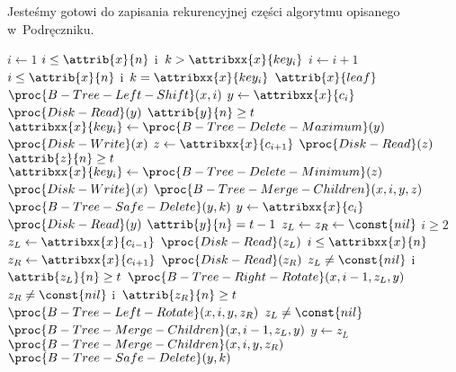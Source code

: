 Jesteśmy gotowi do zapisania rekurencyjnej części algorytmu opisanego w~Podręczniku.
\begin{codebox}
    \li $i\gets1$ \label{li:b-tree-safe-delete-search-begin}
    \li \While $i\le\attrib{x}{n}$ i~$k>\attribxx{x}{key_i}$
    \li     \Do $i\gets i+1$
            \End \label{li:b-tree-safe-delete-search-end}
    \li \If $i\le\attrib{x}{n}$ i~$k=\attribxx{x}{key_i}$
    \li     \Then \If $\attrib{x}{leaf}$
    \li         \Then $\proc{B-Tree-Left-Shift}(x,i)$ \label{li:b-tree-safe-delete-remove-from-leaf}
    \li         \Else $y\gets\attribxx{x}{c_i}$ \label{li:b-tree-safe-delete-remove-predecessor-begin}
    \li             $\proc{Disk-Read}(y)$
    \li             \If $\attrib{y}{n}\ge t$
    \li                 \Then $\attribxx{x}{key_i}\gets\proc{B-Tree-Delete-Maximum}(y)$
    \li                     $\proc{Disk-Write}(x)$ \label{li:b-tree-safe-delete-remove-predecessor-end}
    \li                 \Else $z\gets\attribxx{x}{c_{i+1}}$ \label{li:b-tree-safe-delete-remove-successor-begin}
    \li                     $\proc{Disk-Read}(z)$
    \li                     \If $\attrib{z}{n}\ge t$
    \li                         \Then $\attribxx{x}{key_i}\gets\proc{B-Tree-Delete-Minimum}(z)$
    \li                             $\proc{Disk-Write}(x)$ \label{li:b-tree-safe-delete-remove-successor-end}
    \li                         \Else $\proc{B-Tree-Merge-Children}(x,i,y,z)$ \label{li:b-tree-safe-delete-remove-merge-children-1}
    \li                             $\proc{B-Tree-Safe-Delete}(y,k)$ \label{li:b-tree-safe-delete-recursive-call-1}
                                \End
                        \End
                \End
    \li     \Else $y\gets\attribxx{x}{c_i}$
    \li         $\proc{Disk-Read}(y)$
    \li         \If $\attrib{y}{n}=t-1$
    \li             \Then $z_L\gets z_R\gets\const{nil}$
    \li                 \If $i\ge2$
    \li                     \Then $z_L\gets\attribxx{x}{c_{i-1}}$
    \li                         $\proc{Disk-Read}(z_L)$
                            \End
    \li                 \If $i\le\attribxx{x}{n}$
    \li                     \Then $z_R\gets\attribxx{x}{c_{i+1}}$
    \li                         $\proc{Disk-Read}(z_R)$
                            \End
    \li                 \If $z_L\ne\const{nil}$ i~$\attrib{z_L}{n}\ge t$ \label{li:b-tree-safe-delete-rotations-begin}
    \li                     \Then $\proc{B-Tree-Right-Rotate}(x,i-1,z_L,y)$
    \li                     \ElseIf $z_R\ne\const{nil}$ i~$\attrib{z_R}{n}\ge t$
    \li                         \Then $\proc{B-Tree-Left-Rotate}(x,i,y,z_R)$ \label{li:b-tree-safe-delete-rotations-end}
    \li                     \ElseIf $z_L\ne\const{nil}$ \label{li:b-tree-safe-delete-remove-mergers-begin}
    \li                         \Then $\proc{B-Tree-Merge-Children}(x,i-1,z_L,y)$
    \li                             $y\gets z_L$
    \li                     \ElseNoIf $\proc{B-Tree-Merge-Children}(x,i,y,z_R)$
                            \End \label{li:b-tree-safe-delete-remove-mergers-end}
                    \End \label{li:b-tree-safe-delete-key-brothers-end}
    \li         $\proc{B-Tree-Safe-Delete}(y,k)$ \label{li:b-tree-safe-delete-recursive-call-2}
            \End
\end{codebox}
